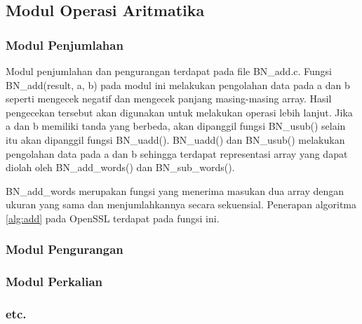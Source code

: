 %
%
%
%
%

\subsection{Modul Operasi Aritmatika}
\subsubsection{Modul Penjumlahan}
Modul penjumlahan dan pengurangan terdapat pada file BN\_add.c. Fungsi BN\_add(result, a, b) pada modul ini melakukan pengolahan data pada a dan b seperti mengecek negatif dan mengecek panjang masing-masing array. Hasil pengecekan tersebut akan digunakan untuk melakukan operasi lebih lanjut. Jika a dan b memiliki tanda yang berbeda, akan dipanggil fungsi BN\_usub() selain itu akan dipanggil fungsi BN\_uadd(). BN\_uadd() dan BN\_usub() melakukan pengolahan data pada a dan b sehingga terdapat representasi array yang dapat diolah oleh BN\_add\_words() dan BN\_sub\_words().

BN\_add\_words merupakan fungsi yang menerima masukan dua array dengan ukuran yang sama dan menjumlahkannya secara sekuensial. Penerapan algoritma \ref{alg:add} pada OpenSSL terdapat pada fungsi ini.

%
%
%
%



\subsubsection{Modul Pengurangan}
\subsubsection{Modul Perkalian}
\subsubsection{etc.}
